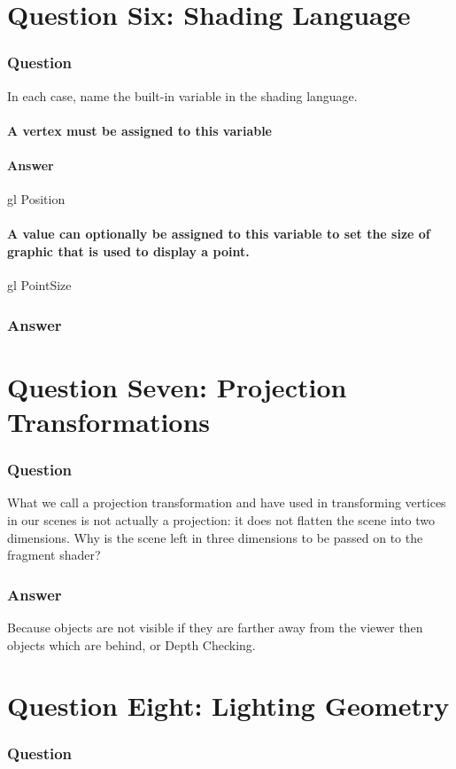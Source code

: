 \documentclass{report}
\begin{document}
\part{Question Six: Shading Language}
\section{Question}
In each case, name the built-in variable in the shading language.
\subsection{ A vertex must be assigned to this variable}
\subsection{Answer}
gl Position
\subsection{ A value can optionally be assigned to this variable to set the size of graphic that is used to display a point.}
gl PointSize
\section{Answer}
\part{Question Seven: Projection Transformations}
\section{Question}
What we call a projection transformation and have used in transforming vertices in our scenes is not actually a projection: it does not flatten the scene into two dimensions. Why is the scene left in three dimensions to be passed on to the fragment shader?
\section{Answer}
Because objects are not visible if they are farther away from the viewer then objects which are behind, or Depth Checking.
\part{Question Eight: Lighting Geometry}
\section{Question}
\end{document}
